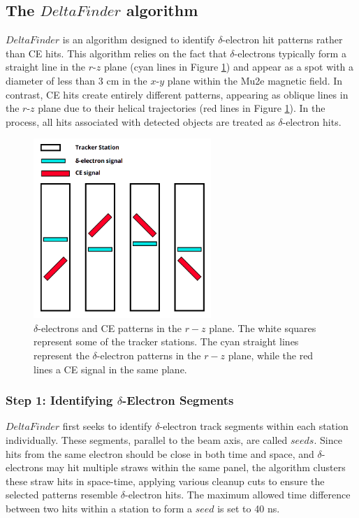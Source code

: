 \subsection{The $DeltaFinder$ algorithm}\label{deltafinder}

$DeltaFinder$ is an algorithm designed to identify $\delta$-electron 
hit patterns rather than CE hits. This algorithm relies on the 
fact that $\delta$-electrons typically form a straight line in 
the $r$-$z$ plane (cyan lines in Figure \ref{fig:yzviewdelta}) 
and appear as a spot with a diameter of less than 3 cm in the 
$x$-$y$ plane within the Mu2e magnetic field. In contrast, 
CE hits create entirely different patterns, appearing as oblique lines in 
the $r$-$z$ plane due to their helical trajectories (red lines in Figure \ref{fig:yzviewdelta}). 
In the process, all hits associated with detected objects are treated as $\delta$-electron hits.
\begin{figure}[!h]
    \centering
    \includegraphics[width =0.6\textwidth]{figures/png/Screenshot_20240811_123048.png}
    \caption[$\delta$-electrons and CE patterns in $r-z$ plane.]{
        $\delta$-electrons and CE patterns in the $r-z$ plane. 
        The white squares represent some of the tracker stations. 
        The cyan straight lines represent the $\delta$-electron 
        patterns in the $r-z$ plane, while the red lines a CE signal in the same plane.
        }
    \label{fig:yzviewdelta}
\end{figure}
\subsubsection{Step 1: Identifying $\delta$-Electron Segments}
$DeltaFinder$ first seeks to identify $\delta$-electron track 
segments within each station individually. These segments, 
parallel to the beam axis, are called $seeds$. Since hits 
from the same electron should be close in both time and space, 
and $\delta$-electrons may hit multiple straws within the 
same panel, the algorithm clusters these straw hits in 
space-time, applying various cleanup cuts to ensure the 
selected patterns resemble $\delta$-electron hits. 
The maximum allowed time difference between two hits within 
a station to form a $seed$ is set to 40 ns.


